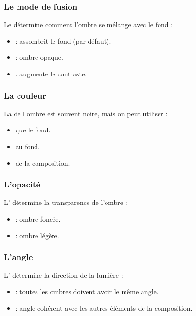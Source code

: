 \subsubsection{Le mode de fusion}

Le  détermine comment l'ombre se mélange avec le fond :

\begin{itemize}
    \item {} : assombrit le fond (par défaut).
    \item {} : ombre opaque.
    \item {} : augmente le contraste.
\end{itemize}

\subsubsection{La couleur}

La  de l'ombre est souvent noire, mais on peut utiliser :

\begin{itemize}
    \item {} que le fond.
    \item {} au fond.
    \item {} de la composition.
\end{itemize}

\subsubsection{L'opacité}

L' détermine la transparence de l'ombre :

\begin{itemize}
    \item {} : ombre foncée.
    \item {} : ombre légère.
\end{itemize}

\subsubsection{L'angle}

L' détermine la direction de la lumière :

\begin{itemize}
    \item {} : toutes les ombres doivent avoir le même angle.
    \item {} : angle cohérent avec les autres éléments de la composition.
\end{itemize}

